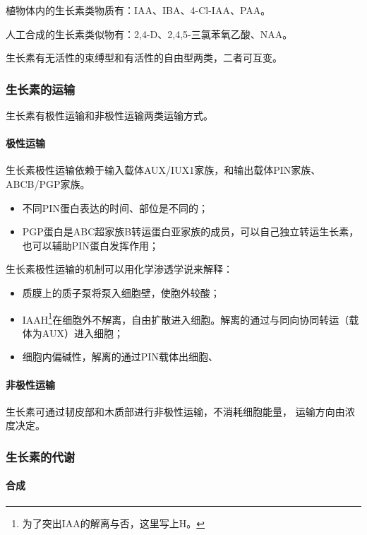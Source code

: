 植物体内的生长素类物质有：IAA、IBA、4-Cl-IAA、PAA。

人工合成的生长素类似物有：2,4-D、2,4,5-三氯苯氧乙酸、NAA。

生长素有无活性的束缚型和有活性的自由型两类，二者可互变。

\subsubsection{生长素的运输}

生长素有极性运输和非极性运输两类运输方式。

\paragraph{极性运输}

生长素极性运输依赖于输入载体AUX/IUX1家族，和输出载体PIN家族、ABCB/PGP家族。\\
\begin{itemize}
	\item 不同PIN蛋白表达的时间、部位是不同的；
	\item PGP蛋白是ABC超家族B转运蛋白亚家族的成员，可以自己独立转运生长素，也可以辅助PIN蛋白发挥作用；
\end{itemize}

生长素极性运输的机制可以用化学渗透学说来解释：

\begin{itemize}
	\item 质膜上的质子泵将泵入细胞壁，使胞外较酸；
	\item IAAH\footnote{为了突出IAA的解离与否，这里写上H。}在细胞外不解离，自由扩散进入细胞。解离的通过与同向协同转运（载体为AUX）进入细胞；
	\item 细胞内偏碱性，解离的通过PIN载体出细胞、
\end{itemize}

\paragraph{非极性运输}

生长素可通过韧皮部和木质部进行非极性运输，不消耗细胞能量， 运输方向由浓度决定。

\subsubsection{生长素的代谢}

\paragraph{合成}

